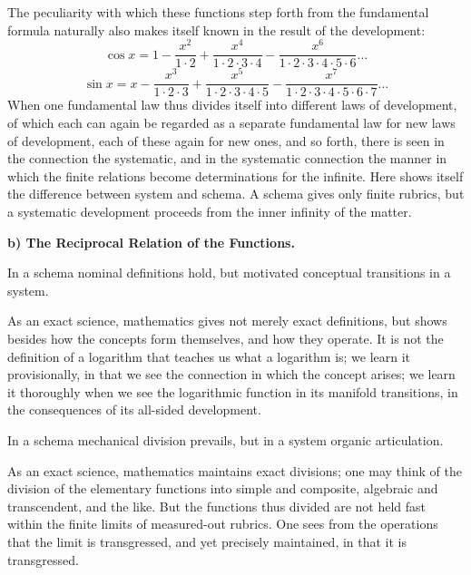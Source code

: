 \documentclass[12pt]{book}
\begin{document}
The peculiarity with which these functions step forth from the fundamental formula
naturally also makes itself known in the result of the development:
\[
\cos x = 1 - \frac{x^{2}}{1\cdot 2} + \frac{x^{4}}{1\cdot 2\cdot 3\cdot 4}
- \frac{x^{6}}{1\cdot 2\cdot 3\cdot 4\cdot 5\cdot 6}\dots
\]
\[
\sin x = x - \frac{x^{3}}{1\cdot 2\cdot 3} + \frac{x^{5}}{1\cdot 2\cdot 3\cdot
4\cdot 5} - \frac{x^{7}}{1\cdot 2\cdot 3\cdot 4\cdot 5\cdot 6\cdot 7}\dots
\]
When one fundamental law thus divides itself into different laws of development, of
which each can again be regarded as a separate fundamental law for new laws of
development, each of these again
for new ones, and so forth, there is seen in the connection the systematic, and in
the systematic connection the manner in which the finite relations become
determinations for the infinite. Here shows itself the difference between system and
schema. A schema gives only finite rubrics, but a systematic development proceeds
from the inner infinity of the matter.

\begin{center}
\textbf{b) The Reciprocal Relation of the Functions.}
\end{center}
{}

In a schema nominal definitions hold, but motivated conceptual transitions in a
system.

As an exact science, mathematics gives not merely exact definitions, but shows
besides how the concepts form themselves, and how they operate. It is not the
definition of a logarithm that teaches us what a logarithm is; we learn it
provisionally, in that we see the connection in which the concept arises; we learn
it thoroughly when we see the logarithmic function in its manifold transitions, in
the consequences of its all-sided development.

In a schema mechanical division prevails, but in a system organic articulation.

As an exact science, mathematics maintains exact divisions; one may think of the
division of the elementary functions into simple and composite, algebraic and
transcendent, and the like. But the functions thus divided are not held fast within
the finite limits of measured-out rubrics. One sees from the operations that the
limit is transgressed, and yet precisely maintained, in that it is transgressed.
\end{document}
